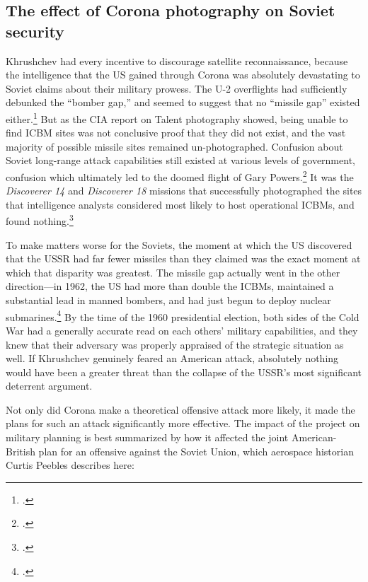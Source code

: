 \documentclass{report}
\begin{document}
\subsection{The effect of Corona photography on Soviet security}

Khrushchev had every incentive to discourage satellite reconnaissance, because the intelligence that the US gained through Corona was absolutely devastating to Soviet claims about their military prowess. The U-2 overflights had sufficiently debunked the ``bomber gap,'' and seemed to suggest that no ``missile gap'' existed either.\footcite{goodpaster_cold_2003} But as the CIA report on Talent photography showed, being unable to find ICBM sites was not conclusive proof that they did not exist, and the vast majority of possible missile sites remained un-photographed. Confusion about Soviet long-range attack capabilities still existed at various levels of government, confusion which ultimately led to the doomed flight of Gary Powers.\footcite[p.~344]{brugioni_eyes_2010} It was the \emph{Discoverer 14} and \emph{Discoverer 18} missions that successfully photographed the sites that intelligence analysts considered most likely to host operational ICBMs, and found nothing.\footcite[p.~379]{brugioni_eyes_2010}

To make matters worse for the Soviets, the moment at which the US discovered that the USSR had far fewer missiles than they claimed was the exact moment at which that disparity was greatest. The missile gap actually went in the other direction---in 1962, the US had more than double the ICBMs, maintained a substantial lead in manned bombers, and had just begun to deploy nuclear submarines.\footcite[p.~251]{mcdougall_heavens_1985} By the time of the 1960 presidential election, both sides of the Cold War had a generally accurate read on each others' military capabilities, and they knew that their adversary was properly appraised of the strategic situation as well.  If Khrushchev genuinely feared an American attack, absolutely nothing would have been a greater threat than the collapse of the USSR's most significant deterrent argument.

Not only did Corona make a theoretical offensive attack more likely, it made the plans for such an attack significantly more effective. The impact of the project on military planning is best summarized by how it affected the joint American-British plan for an offensive against the Soviet Union, which aerospace historian Curtis Peebles describes here:
\end{document}
